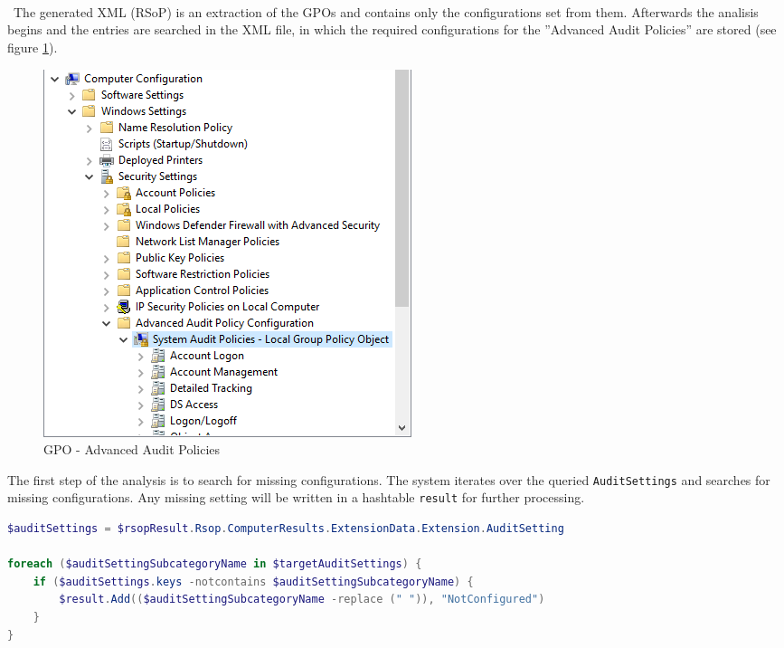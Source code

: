 \begin{multicols}{2}
    \ \\\\\\ \
    The generated XML (RSoP) is an extraction of the GPOs and contains only the configurations set from them.
    Afterwards the analisis begins and the entries are searched in the XML file, in which the required configurations for the ''Advanced Audit Policies'' are stored (see figure \ref{fig:AdvancedAuditPolicies}).
    \begin{figure}[H]
        \centering
        \includegraphics[width=0.7\linewidth]{assets/GetAndCheckAuditPolicies/advancedauditpolicies.png}
        \caption{GPO - Advanced Audit Policies}\label{fig:AdvancedAuditPolicies}
    \end{figure}
\end{multicols}
The first step of the analysis is to search for missing configurations. The system iterates over the queried \lstinline|AuditSettings| and searches for missing configurations. Any missing setting will be written in a hashtable \lstinline|result| for further processing.
\begin{lstlisting}[caption=GetAndCheckAuditPolicies: Search missing configurations, language=PowerShell]
$auditSettings = $rsopResult.Rsop.ComputerResults.ExtensionData.Extension.AuditSetting

foreach ($auditSettingSubcategoryName in $targetAuditSettings) {
    if ($auditSettings.keys -notcontains $auditSettingSubcategoryName) {
        $result.Add(($auditSettingSubcategoryName -replace (" ")), "NotConfigured")
    }
}
\end{lstlisting}

